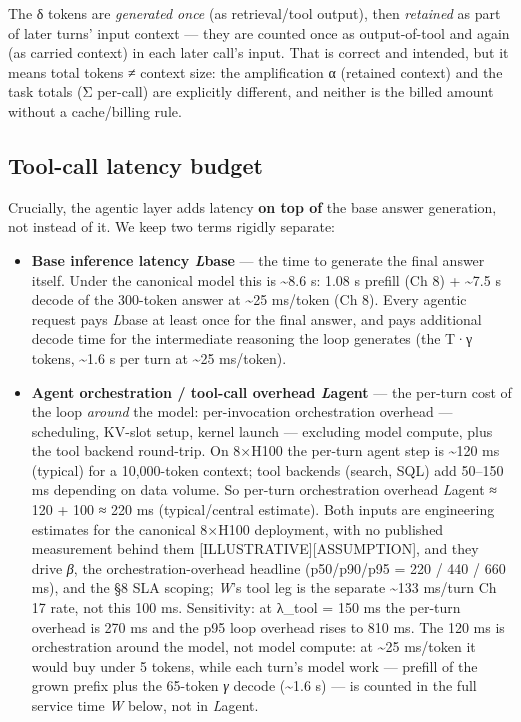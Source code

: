 The δ tokens are \emph{generated once} (as retrieval/tool output), then
\emph{retained} as part of later turns' input context --- they are
counted once as output-of-tool and again (as carried context) in each
later call's input. That is correct and intended, but it means total
tokens ≠ context size: the amplification α (retained context) and the
task totals (Σ per-call) are explicitly different, and neither is the
billed amount without a cache/billing rule.

\subsection{Tool-call latency budget}\label{tool-call-latency-budget}

Crucially, the agentic layer adds latency \textbf{on top of} the base
answer generation, not instead of it. We keep two terms rigidly
separate:

\begin{itemize}
\tightlist
\item
  \textbf{Base inference latency \emph{L}base} --- the time to generate
  the final answer itself. Under the canonical model this is
  \textasciitilde8.6 s: 1.08 s prefill (Ch 8) + \textasciitilde7.5 s
  decode of the 300-token answer at \textasciitilde25 ms/token (Ch 8).
  Every agentic request pays \emph{L}base at least once for the final
  answer, and pays additional decode time for the intermediate reasoning
  the loop generates (the T·γ tokens, \textasciitilde1.6 s per turn at
  \textasciitilde25 ms/token).
\item
  \textbf{Agent orchestration / tool-call overhead \emph{L}agent} ---
  the per-turn cost of the loop \emph{around} the model: per-invocation
  orchestration overhead --- scheduling, KV-slot setup, kernel launch
  --- excluding model compute, plus the tool backend round-trip. On
  8×H100 the per-turn agent step is \textasciitilde120 ms (typical) for
  a 10,000-token context; tool backends (search, SQL) add 50--150 ms
  depending on data volume. So per-turn orchestration overhead
  \emph{L}agent ≈ 120 + 100 ≈ 220 ms (typical/central estimate). Both
  inputs are engineering estimates for the canonical 8×H100 deployment,
  with no published measurement behind them
  \mbox{{[}ILLUSTRATIVE{]}}\hspace{0pt}\mbox{{[}ASSUMPTION{]}}, and they drive \emph{β}, the
  orchestration-overhead headline (p50/p90/p95 = 220 / 440 / 660 ms),
  and the §8 SLA scoping; \emph{W}'s tool leg is the separate
  \textasciitilde133 ms/turn Ch 17 rate, not this 100 ms. Sensitivity:
  at λ\_tool = 150 ms the per-turn overhead is 270 ms and the p95 loop
  overhead rises to 810 ms. The 120 ms is orchestration around the
  model, not model compute: at \textasciitilde25 ms/token it would buy
  under 5 tokens, while each turn's model work --- prefill of the grown
  prefix plus the 65-token \emph{γ} decode (\textasciitilde1.6 s) --- is
  counted in the full service time \emph{W} below, not in \emph{L}agent.
\end{itemize}

